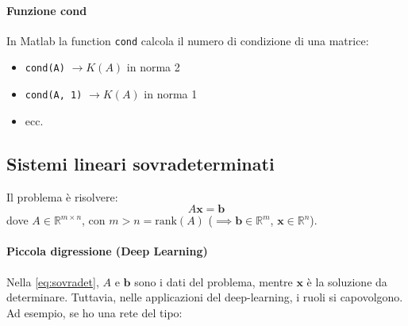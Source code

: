 \paragraph{Funzione cond}
In Matlab la function \texttt{cond} calcola il numero di condizione di una matrice:
\begin{itemize}
    \item \texttt{cond(A)} $\rightarrow K(A)$ in norma 2
    \item \texttt{cond(A, 1)} $\rightarrow K(A)$ in norma 1
    \item ecc.
\end{itemize}

\subsection{Sistemi lineari sovradeterminati}
Il problema è risolvere:
\begin{equation} \label{eq:sovradet}
    A\mathbf{x} = \mathbf{b}
\end{equation}
dove $A \in \mathbb{R}^{m \times n}$, con $m > n = \text{rank}(A)$ ($\implies \mathbf{b} \in \mathbb{R}^m$, $\mathbf{x} \in \mathbb{R}^n$).

\paragraph{Piccola digressione (Deep Learning)}
Nella \eqref{eq:sovradet}, $A$ e $\mathbf{b}$ sono i dati del problema, mentre $\mathbf{x}$ è la soluzione da determinare.
Tuttavia, nelle applicazioni del deep-learning, i ruoli si capovolgono.
Ad esempio, se ho una rete del tipo:

